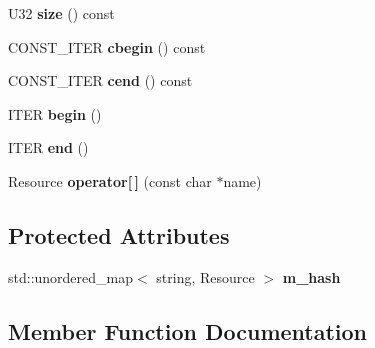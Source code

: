 \begin{DoxyCompactItemize}
\item 
\hypertarget{classps_1_1FastAccessNamedResource_a4053b80e5555ecdab7970404e564c3c6}{}U32 {\bfseries size} () const \label{classps_1_1FastAccessNamedResource_a4053b80e5555ecdab7970404e564c3c6}

\item 
\hypertarget{classps_1_1FastAccessNamedResource_afed3ed3697e3af465bf7f87e6ff6f430}{}C\+O\+N\+S\+T\+\_\+\+I\+T\+E\+R {\bfseries cbegin} () const \label{classps_1_1FastAccessNamedResource_afed3ed3697e3af465bf7f87e6ff6f430}

\item 
\hypertarget{classps_1_1FastAccessNamedResource_add5d7e074b8c71e8f203c58d28029bb2}{}C\+O\+N\+S\+T\+\_\+\+I\+T\+E\+R {\bfseries cend} () const \label{classps_1_1FastAccessNamedResource_add5d7e074b8c71e8f203c58d28029bb2}

\item 
\hypertarget{classps_1_1FastAccessNamedResource_ac7eadf05030c0db15c98a4a5bebf066f}{}I\+T\+E\+R {\bfseries begin} ()\label{classps_1_1FastAccessNamedResource_ac7eadf05030c0db15c98a4a5bebf066f}

\item 
\hypertarget{classps_1_1FastAccessNamedResource_a970641642502283ce3de57eb11edb06d}{}I\+T\+E\+R {\bfseries end} ()\label{classps_1_1FastAccessNamedResource_a970641642502283ce3de57eb11edb06d}

\item 
\hypertarget{classps_1_1FastAccessNamedResource_a84a30a22f21d084019dc3f0622ab81b7}{}Resource {\bfseries operator\mbox{[}$\,$\mbox{]}} (const char $\ast$name)\label{classps_1_1FastAccessNamedResource_a84a30a22f21d084019dc3f0622ab81b7}

\end{DoxyCompactItemize}
\subsection*{Protected Attributes}
\begin{DoxyCompactItemize}
\item 
\hypertarget{classps_1_1FastAccessNamedResource_a1aa9cbd37a93fe951c6fefa8e094dea6}{}std\+::unordered\+\_\+map$<$ string, Resource $>$ {\bfseries m\+\_\+hash}\label{classps_1_1FastAccessNamedResource_a1aa9cbd37a93fe951c6fefa8e094dea6}

\end{DoxyCompactItemize}


\subsection{Member Function Documentation}
\hypertarget{classps_1_1FastAccessNamedResource_a768ce90516cc7ed73f4f439cbccbc4ea}{}
